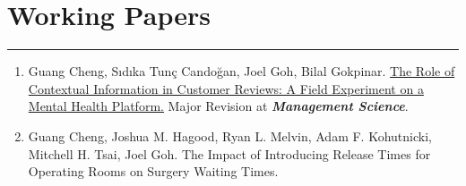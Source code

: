 \documentclass[12pt, a4paper]{article}
\begin{document}
{\section*{Working Papers}
\vspace*{4pt}
\hrule

\begin{enumerate}[leftmargin=30pt, resume]
	
	\item Guang Cheng, S\i{}d\i{}ka Tun\c{c} Cando\u{g}an, Joel Goh, Bilal Gokpinar.
	\href{https://ssrn.com/abstract=4956298}{The Role of Contextual Information in Customer Reviews: A Field Experiment on a Mental Health Platform.} Major Revision at \textit{\textbf{Management Science}}.


	\item Guang Cheng, Joshua M. Hagood, Ryan L. Melvin, Adam F. Kohutnicki, Mitchell H. Tsai, Joel Goh. The Impact of Introducing Release Times for Operating Rooms on Surgery Waiting Times.

\end{enumerate}






	





}
\end{document}
